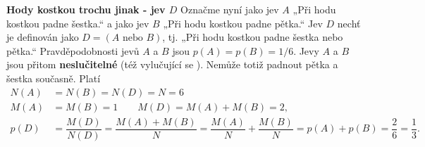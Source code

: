 \wikitextrule
\begin{example}\label{mai:exam056}
  \textbf{Hody kostkou trochu jinak - jev \(D\)}\newline\small
  Označme nyní jako jev \(A\) „Při hodu kostkou padne šestka.“ a jako jev \(B\) „Při hodu kostkou 
  padne pětka.“ Jev \(D\) nechť je definován jako \(D = (A\text{ nebo }B)\), tj. „Při hodu kostkou 
  padne šestka nebo pětka.“ Pravděpodobnosti jevů \(A\) a \(B\) jsou \(p(A) = p(B) = 1/6\). Jevy 
  \(A\) a \(B\) jsou přitom \textbf{neslučitelné} (též vylučující se ). Nemůže
  totiž padnout pětka a šestka současně. Platí
  \begin{align*}
    N(A) &= N(B) = N(D) = N = 6                                                              \\
    M(A) &= M(B) = 1 \qquad M(D) = M(A) + M(B) = 2,                                          \\
    p(D) &= \dfrac{M(D)}{N(D)} = \dfrac{M(A) + M(B)}{N} = \dfrac{M(A)}{N} + \dfrac{M(B)}{N}
          = p(A) + p(B) = \dfrac{2}{6} = \dfrac{1}{3}.
  \end{align*}
  \normalsize
\end{example}